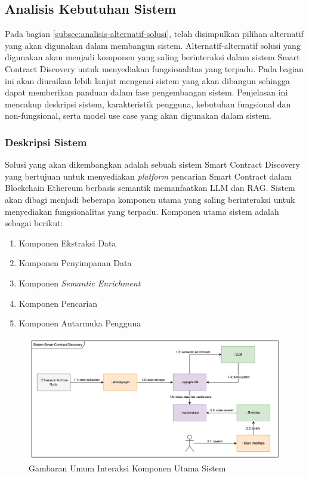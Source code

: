 \subsection{Analisis Kebutuhan Sistem}

Pada bagian \ref{subsec:analisis-alternatif-solusi}, telah disimpulkan pilihan alternatif yang akan digunakan dalam membangun sistem. Alternatif-alternatif solusi yang digunakan akan menjadi komponen yang saling berinteraksi dalam sistem Smart Contract Discovery untuk menyediakan fungsionalitas yang terpadu. Pada bagian ini akan diuraikan lebih lanjut mengenai sistem yang akan dibangun sehingga dapat memberikan panduan dalam fase pengembangan sistem. Penjelasan ini mencakup deskripsi sistem, karakteristik pengguna, kebutuhan fungsional dan non-fungsional, serta model use case yang akan digunakan dalam sistem.

\subsubsection{Deskripsi Sistem}

Solusi yang akan dikembangkan adalah sebuah sistem Smart Contract Discovery yang bertujuan untuk menyediakan \textit{platform} pencarian Smart Contract dalam Blockchain Ethereum berbasis semantik memanfaatkan LLM dan RAG. Sistem akan dibagi menjadi beberapa komponen utama yang saling berinteraksi untuk menyediakan fungsionalitas yang terpadu. Komponen utama sistem adalah sebagai berikut:

\begin{enumerate}
  \item Komponen Ekstraksi Data
  \item Komponen Penyimpanan Data
  \item Komponen \textit{Semantic Enrichment}
  \item Komponen Pencarian
  \item Komponen Antarmuka Pengguna
\end{enumerate}

\begin{figure}[ht]
	\centering
	\includegraphics[width=1\textwidth]{resources/chapter-3/komponen-utama-new.png}
	\caption{Gambaran Umum Interaksi Komponen Utama Sistem}
	\label{image:komponen-sistem}
\end{figure}

